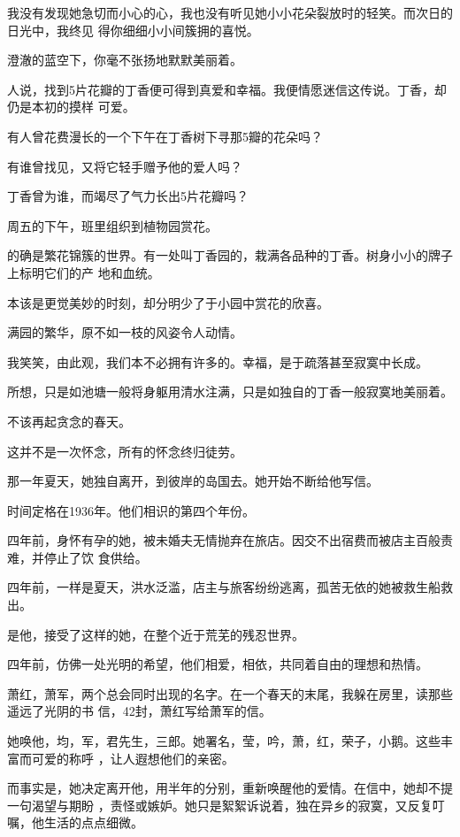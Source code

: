 \documentclass[12pt,a4paper]{article}
\def\blankrev{\vspace{1ex}}									%
\begin{document}
		我没有发现她急切而小心的心，我也没有听见她小小花朵裂放时的轻笑。而次日的日光中，我终见
	得你细细小小间簇拥的喜悦。

		澄澈的蓝空下，你毫不张扬地默默美丽着。

		人说，找到5片花瓣的丁香便可得到真爱和幸福。我便情愿迷信这传说。丁香，却仍是本初的摸样
	可爱。

		有人曾花费漫长的一个下午在丁香树下寻那5瓣的花朵吗？\par
		有谁曾找见，又将它轻手赠予他的爱人吗？\par
		丁香曾为谁，而竭尽了气力长出5片花瓣吗？

		周五的下午，班里组织到植物园赏花。

		的确是繁花锦簇的世界。有一处叫丁香园的，栽满各品种的丁香。树身小小的牌子上标明它们的产
	地和血统。

		本该是更觉美妙的时刻，却分明少了于小园中赏花的欣喜。

		满园的繁华，原不如一枝的风姿令人动情。\par
		我笑笑，由此观，我们本不必拥有许多的。幸福，是于疏落甚至寂寞中长成。

		所想，只是如池塘一般将身躯用清水注满，只是如独自的丁香一般寂寞地美丽着。\par
		不该再起贪念的春天。


		\blankrev
		这并不是一次怀念，所有的怀念终归徒劳。

	\endwriting



		那一年夏天，她独自离开，到彼岸的岛国去。她开始不断给他写信。

		时间定格在1936年。他们相识的第四个年份。

		四年前，身怀有孕的她，被未婚夫无情抛弃在旅店。因交不出宿费而被店主百般责难，并停止了饮
	食供给。

		四年前，一样是夏天，洪水泛滥，店主与旅客纷纷逃离，孤苦无依的她被救生船救出。

		是他，接受了这样的她，在整个近于荒芜的残忍世界。

		四年前，仿佛一处光明的希望，他们相爱，相依，共同着自由的理想和热情。

		萧红，萧军，两个总会同时出现的名字。在一个春天的末尾，我躲在房里，读那些遥远了光阴的书
	信，42封，萧红写给萧军的信。

		她唤他，均，军，君先生，三郎。她署名，莹，吟，萧，红，荣子，小鹅。这些丰富而可爱的称呼
	，让人遐想他们的亲密。

		而事实是，她决定离开他，用半年的分别，重新唤醒他的爱情。在信中，她却不提一句渴望与期盼
	，责怪或嫉妒。她只是絮絮诉说着，独在异乡的寂寞，又反复叮嘱，他生活的点点细微。
\end{document}
